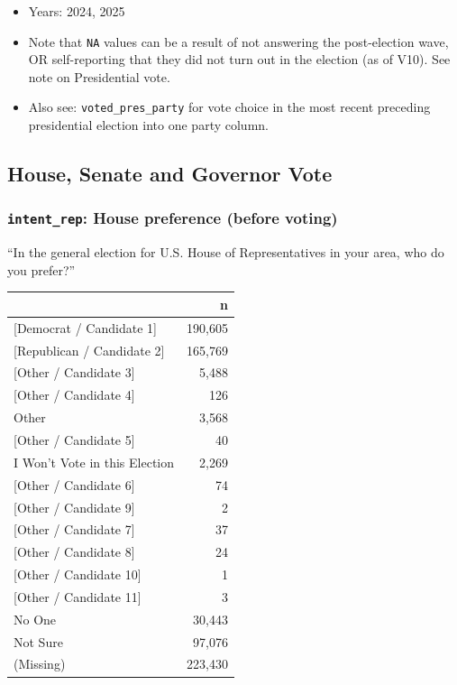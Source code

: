 \documentclass[10pt,article,oneside]{memoir}
\begin{document}
\begin{itemize}
\tightlist
\item
  Years: 2024, 2025
\item
  Note that \texttt{NA} values can be a result of not answering the
  post-election wave, OR self-reporting that they did not turn out in
  the election (as of V10). See note on Presidential vote.
\item
  Also see: \texttt{voted\_pres\_party} for vote choice in the most
  recent preceding presidential election into one party column.
\end{itemize}

\subsection{House, Senate and Governor
Vote}\label{house-senate-and-governor-vote}

\subsubsection{\texorpdfstring{\texttt{intent\_rep}: House preference
(before
voting)}{intent\_rep: House preference (before voting)}}\label{intent_rep-house-preference-before-voting}

``In the general election for U.S. House of Representatives in your
area, who do you prefer?''

\begin{table}[H]
\centering
\begin{tabular}[t]{lr}
\toprule
 & n\\
\midrule
{}{[Democrat / Candidate 1]} & 190,605\\
{}{[Republican / Candidate 2]} & 165,769\\
{}{[Other / Candidate 3]} & 5,488\\
{}{[Other / Candidate 4]} & 126\\
Other & 3,568\\
{}{[Other / Candidate 5]} & 40\\
I Won't Vote in this Election & 2,269\\
{}{[Other / Candidate 6]} & 74\\
{}{[Other / Candidate 9]} & 2\\
{}{[Other / Candidate 7]} & 37\\
{}{[Other / Candidate 8]} & 24\\
{}{[Other / Candidate 10]} & 1\\
{}{[Other / Candidate 11]} & 3\\
No One & 30,443\\
Not Sure & 97,076\\
(Missing) & 223,430\\
\bottomrule
\end{tabular}
\end{table}
\end{document}
